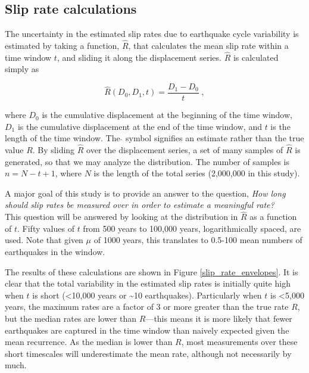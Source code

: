 \documentclass[se, manuscript]{copernicus}
\begin{document}
\subsection{Slip rate calculations}\label{slip-rate-calculations}

The uncertainty in the estimated slip rates due to earthquake cycle
variability is estimated by taking a function, \(\hat{R}\), that
calculates the mean slip rate within a time window \(t\), and sliding it
along the displacement series. \(\hat{R}\) is calculated simply as

\begin{equation}
  \hat{R}(D_0,D_1,t) = \frac{D_1 - D_0}{t}\; ,
  \label{eqn-rate-calc}
\end{equation}

where \(D_0\) is the cumulative displacement at the beginning of the
time window, \(D_1\) is the cumulative displacement at the end of the
time window, and \(t\) is the length of the time window. The \(\hat{}\)
symbol signifies an estimate rather than the true value \(R\). By
sliding \(\hat{R}\) over the displacement series, a set of many samples
of \(\hat{R}\) is generated, so that we may analyze the distribution.
The number of samples is \(n = N - t + 1\), where \(N\) is the length of
the total series (2,000,000 in this study).

A major goal of this study is to provide an answer to the question,
\emph{How long should slip rates be measured over in order to estimate a
meaningful rate?}\\
This question will be answered by looking at the distribution in
\(\hat{R}\) as a function of \(t\). Fifty values of \(t\) from 500 years
to 100,000 years, logarithmically spaced, are used. Note that given
\(\mu\) of 1000 years, this translates to 0.5-100 mean numbers of
earthquakes in the window.

The results of these calculations are shown in Figure
\ref{slip_rate_envelopes}. It is clear that the total variability in the
estimated slip rates is initially quite high when \(t\) is short
(\textless{}10,000 years or \textasciitilde{}10 earthquakes).
Particularly when \(t\) is \textless{}5,000 years, the maximum rates are
a factor of 3 or more greater than the true rate \(R\), but the median
rates are lower than \(R\)---this means it is more likely that fewer
earthquakes are captured in the time window than naively expected given
the mean recurrence. As the median is lower than \(R\), most
measurements over these short timescales will underestimate the mean
rate, although not necessarily by much.
\end{document}
